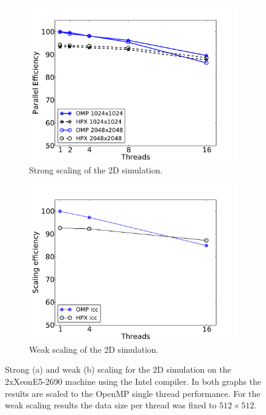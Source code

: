\documentclass[10pt]{elsarticle}
\begin{document}
\begin{figure}
 \begin{subfigure}[b]{0.49\textwidth}
  \centering
  \includegraphics[width=\textwidth]{ariel_strong_scaling.pdf}\hfill
  \caption{Strong scaling of the 2D simulation.} 
  \label{fig:strong_scaling2D}
 \end{subfigure}
 \begin{subfigure}[b]{0.49\textwidth}
  \centering
  \includegraphics[width=\textwidth]{ariel_weak_scaling.pdf}\hfill
  \caption{Weak scaling of the 2D simulation.} 
  \label{fig:weak_scaling2D}
 \end{subfigure}
 \caption{Strong (a) and weak (b) scaling for the 2D simulation on the 2xXeonE5-2690 machine using the Intel compiler. In both graphs the results are scaled to the OpenMP single thread performance. For the weak scaling results the data size per thread was fixed to $512\times512$.}
 \label{fig:marvin_scaling2D}
\end{figure}
\end{document}
